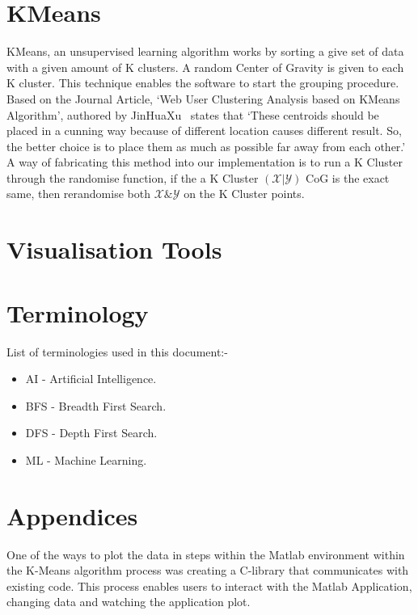 \documentclass[conference]{IEEEtran}
\begin{document}

    \section{KMeans}
      KMeans, an unsupervised learning algorithm works by sorting a give set of data with a given amount of K clusters. A random Center of Gravity is given to each K cluster. This technique enables the software to start the grouping procedure. Based on the Journal Article, `Web User Clustering Analysis based on KMeans Algorithm', authored by JinHuaXu~\cite{jinhuaxu_web_2010} states that `These centroids should be placed in a cunning way because of different location causes different result. So, the better choice is to place them as much as possible far away from each other.' A way of fabricating this method into our implementation is to run a K Cluster through the randomise function, if the a K Cluster $(\mathcal{X} | \mathcal{Y})$ CoG is the exact same, then rerandomise both $\mathcal{X} \& \mathcal{Y}$ on the K Cluster points.
    \section{Visualisation Tools}

    \section{Terminology}
      List of terminologies used in this document:-
      \begin{itemize}
        \item AI - Artificial Intelligence.
        \item BFS - Breadth First Search.
        \item DFS - Depth First Search.
        \item ML - Machine Learning.
      \end{itemize}

    \section{Appendices}
      One of the ways to plot the data in steps within the Matlab environment within the K-Means algorithm process was creating a C-library that communicates with existing code. This process enables users to interact with the Matlab Application, changing data and watching the application plot. 
      
\end{document}
